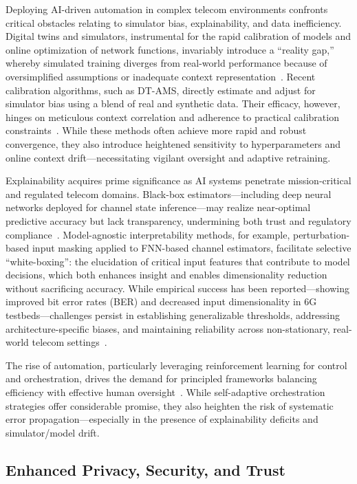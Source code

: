 \documentclass[sigconf]{acmart}
\begin{document}
Deploying AI-driven automation in complex telecom environments confronts critical obstacles relating to simulator bias, explainability, and data inefficiency. Digital twins and simulators, instrumental for the rapid calibration of models and online optimization of network functions, invariably introduce a ``reality gap,'' whereby simulated training diverges from real-world performance because of oversimplified assumptions or inadequate context representation~\cite{ref37,ref41}. Recent calibration algorithms, such as DT-AMS, directly estimate and adjust for simulator bias using a blend of real and synthetic data. Their efficacy, however, hinges on meticulous context correlation and adherence to practical calibration constraints~\cite{ref41}. While these methods often achieve more rapid and robust convergence, they also introduce heightened sensitivity to hyperparameters and online context drift---necessitating vigilant oversight and adaptive retraining.

Explainability acquires prime significance as AI systems penetrate mission-critical and regulated telecom domains. Black-box estimators---including deep neural networks deployed for channel state inference---may realize near-optimal predictive accuracy but lack transparency, undermining both trust and regulatory compliance~\cite{ref38}. Model-agnostic interpretability methods, for example, perturbation-based input masking applied to FNN-based channel estimators, facilitate selective ``white-boxing'': the elucidation of critical input features that contribute to model decisions, which both enhances insight and enables dimensionality reduction without sacrificing accuracy. While empirical success has been reported---showing improved bit error rates (BER) and decreased input dimensionality in 6G testbeds---challenges persist in establishing generalizable thresholds, addressing architecture-specific biases, and maintaining reliability across non-stationary, real-world telecom settings~\cite{ref38,ref41}.

The rise of automation, particularly leveraging reinforcement learning for control and orchestration, drives the demand for principled frameworks balancing efficiency with effective human oversight~\cite{ref37}. While self-adaptive orchestration strategies offer considerable promise, they also heighten the risk of systematic error propagation---especially in the presence of explainability deficits and simulator/model drift.

\subsection{Enhanced Privacy, Security, and Trust}
\end{document}
